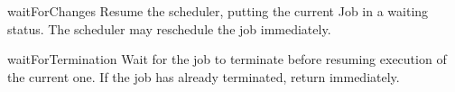 \begin{urbiscriptapi}
\item[waitForChanges] Resume the scheduler, putting the current Job in a
  waiting status.  The scheduler may reschedule the job immediately.

\item[waitForTermination] Wait for the job to terminate before resuming
  execution of the current one.  If the job has already terminated, return
  immediately.
\end{urbiscriptapi}


